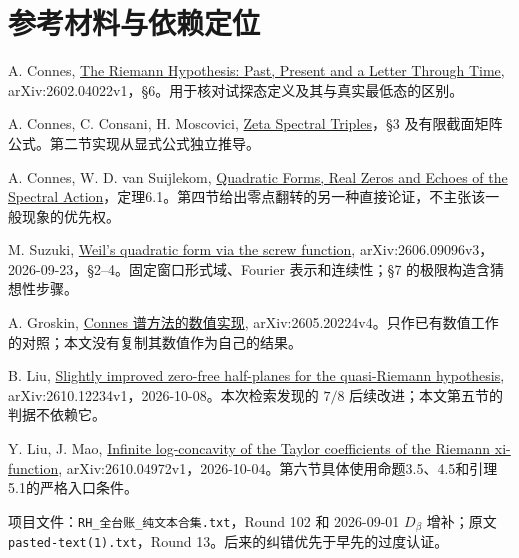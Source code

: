 \documentclass[UTF8,fontset=none,11pt,a4paper]{ctexart}
\begin{document}
\section*{参考材料与依赖定位}
\small
\begin{enumerate}[label={[\arabic*]},leftmargin=2.4em,itemsep=6pt]
\item A. Connes, \href{https://arxiv.org/html/2602.04022v1}{The Riemann Hypothesis: Past, Present and a Letter Through Time}, arXiv:2602.04022v1，\S6。用于核对试探态定义及其与真实最低态的区别。
\item A. Connes, C. Consani, H. Moscovici, \href{https://alainconnes.org/wp-content/uploads/zeta-spectral-triples-1.pdf}{Zeta Spectral Triples}，\S3 及有限截面矩阵公式。第二节实现从显式公式独立推导。
\item A. Connes, W. D. van Suijlekom, \href{https://alainconnes.org/wp-content/uploads/quadraticforms-1.pdf}{Quadratic Forms, Real Zeros and Echoes of the Spectral Action}，定理6.1。第四节给出零点翻转的另一种直接论证，不主张该一般现象的优先权。
\item M. Suzuki, \href{https://arxiv.org/html/2606.09096v3}{Weil's quadratic form via the screw function}, arXiv:2606.09096v3，2026-09-23，\S2--4。固定窗口形式域、Fourier 表示和连续性；\S7 的极限构造含猜想性步骤。
\item A. Groskin, \href{https://arxiv.org/html/2605.20224v4}{Connes 谱方法的数值实现}, arXiv:2605.20224v4。只作已有数值工作的对照；本文没有复制其数值作为自己的结果。
\item B. Liu, \href{https://arxiv.org/html/2610.12234v1}{Slightly improved zero-free half-planes for the quasi-Riemann hypothesis}, arXiv:2610.12234v1，2026-10-08。本次检索发现的 $7/8$ 后续改进；本文第五节的判据不依赖它。
\item Y. Liu, J. Mao, \href{https://arxiv.org/html/2610.04972v1}{Infinite log-concavity of the Taylor coefficients of the Riemann xi-function}, arXiv:2610.04972v1，2026-10-04。第六节具体使用命题3.5、4.5和引理5.1的严格入口条件。
\item 项目文件：\texttt{RH\_全台账\_纯文本合集.txt}，Round 102 和 2026-09-01 $D_\beta$ 增补；原文 \texttt{pasted-text(1).txt}，Round 13。后来的纠错优先于早先的过度认证。
\end{enumerate}
\end{document}
